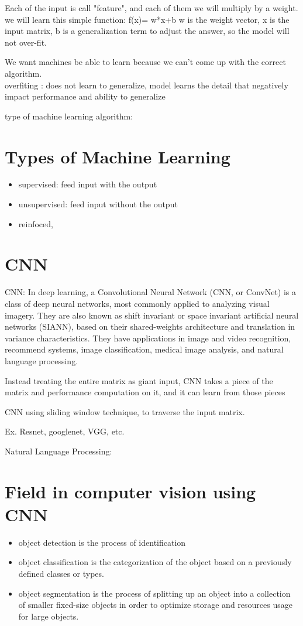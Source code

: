 \documentclass[fancy,11pt,titlestyle=display]{style/elegantbook}
\begin{document}
Each of the input is call "feature", and each of them we will multiply by a weight.
we will learn this simple function: f(x)= w*x+b
w is the weight vector, x is the input matrix, b is a generalization term to adjust the answer, so the model will not over-fit. 

We want machines be able to learn because we can't come up with the correct algorithm.\\

overfiting : does not learn to generalize, model learns the detail that negatively impact performance and ability to generalize

type of machine learning algorithm:

\section{Types of Machine Learning}
\begin{itemize}
\item supervised: feed input with the output
\item unsupervised: feed input without the output
\item reinfoced,
\end{itemize}

\section{CNN}
CNN:
In deep learning, a Convolutional Neural Network (CNN, or ConvNet) is a class of deep neural networks, most commonly applied to analyzing visual imagery. They are also known as shift invariant or space invariant artificial neural networks (SIANN), based on their shared-weights architecture and translation in variance characteristics. They have applications in image and video recognition, recommend systems, image classification, medical image analysis, and natural language processing.


Instead treating the entire matrix as giant input, CNN takes a piece of the matrix and performance computation on it, and it can learn from those pieces 

CNN using sliding window technique, to traverse the input matrix.

Ex. Resnet, googlenet, VGG, etc.


Natural Language Processing: 

\section{Field in computer vision using CNN}
\begin{itemize}
\item object detection is the process of identification 
\item object classification is the categorization of the object based on a previously defined classes or types.
\item object segmentation is the process of splitting up an object into a collection of smaller fixed-size objects in order to optimize storage and resources usage for large objects.
\end{itemize}
\end{document}
